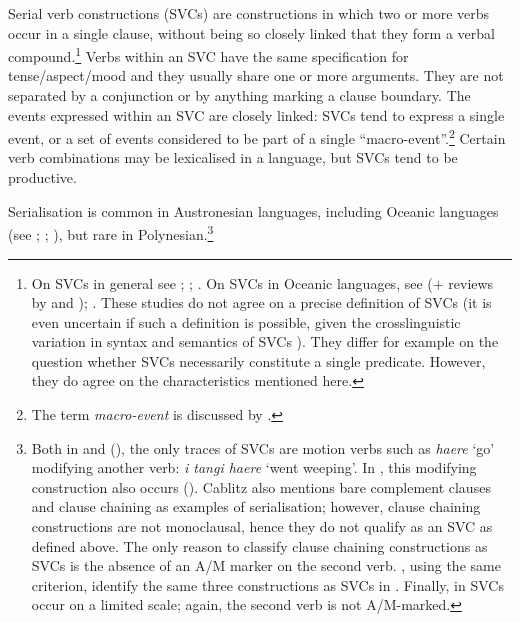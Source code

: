 Serial verb constructions (SVCs) are constructions in which two or more verbs occur in a single clause, without being so closely linked that they form a verbal compound.\footnote{\label{fn:370}On SVCs in general see \citet{Durie1988,Durie1997}; \citet{AikhenvaldDixon2006}; \citet{Sebba1987}. On SVCs in Oceanic languages, see \citet{Crowley2002} (+ reviews by \citet{Owens2002} and \citet{Bradshaw2004}); \citet{Senft2008}. These studies do not agree on a precise definition of SVCs (it is even uncertain if such a definition is possible, given the crosslinguistic variation in syntax and semantics of SVCs \citep[19]{Crowley2002}). They differ for example on the question whether SVCs necessarily constitute a single predicate. However, they do agree on the characteristics mentioned here.} Verbs within an SVC have the same specification for tense/aspect/mood and they usually share one or more arguments. They are not separated by a conjunction or by anything marking a clause boundary. The events expressed within an SVC are closely linked: SVCs tend to express a single event, or a set of events considered to be part of a single “macro-event”.\footnote{\label{fn:371}The term \textit{macro-event} is discussed by \citet{Aikhenvald2006}.}  Certain verb combinations may be lexicalised in a language, but SVCs tend to be productive.

Serialisation is common in Austronesian languages, including Oceanic languages (see \citealt{Crowley2002}; \citealt{Senft2008}; \citealt{Durie1988}), but rare in Polynesian.\footnote{\label{fn:372}Both in  \citep[150]{Harlow2007Maori} and  (\citet[203]{AcadémieTahitienne1986}), the only traces of SVCs are motion verbs such as \textit{haere} ‘go’ modifying another verb:  \textit{i tangi haere} ‘went weeping’. In , this modifying construction also occurs (\citealt[205–206]{Cablitz2006}). Cablitz also mentions bare complement clauses and clause chaining as examples of serialisation; however, clause chaining constructions are not monoclausal, hence they do not qualify as an SVC as defined above. The only reason to classify clause chaining constructions as SVCs is the absence of an A/M marker on the second verb. \citet[397]{MoselHovdhaugen1992}, using the same criterion, identify the same three constructions as SVCs in . Finally, in  \citep[538]{Besnier2000} SVCs occur on a limited scale; again, the second verb is not A/M-marked.} 

